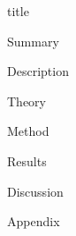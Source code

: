 \documentclass{article}
\begin{document}
{title}

{Summary}
\newpage

\frontmatter

\tableofcontents
\newpage

\mainmatter

{Description}
\newpage

{Theory}
\newpage

{Method}
\newpage

{Results}
\newpage

{Discussion}
\newpage


\nocite{*}
\printbibliography[heading = bibintoc, title = References] 
\newpage

{Appendix}
\newpage

\end{document}
